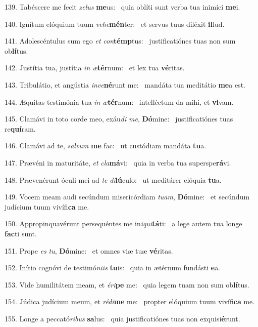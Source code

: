 139. Tabéscere me fecit \textit{ze}\textit{lus} \textbf{me}us: \ast\  quia oblíti sunt verba tua inimíci \textbf{me}i.\

140. Ignítum elóquium tuum \textit{ve}\textit{he}\textbf{mén}ter: \ast\  et servus tuus diléxit \textbf{il}lud.\

141. Adolescéntulus sum ego \textit{et} \textit{con}\textbf{témp}tus: \ast\  justificatiónes tuas non sum ob\textbf{lí}tus.\

142. Justítia tua, justítia \textit{in} \textit{æ}\textbf{tér}num: \ast\  et lex tua \textbf{vé}ritas.\

143. Tribulátio, et angústia \textit{in}\textit{ve}\textbf{né}runt me: \ast\  mandáta tua meditátio \textbf{me}a est.\

144. Æquitas testimónia tua \textit{in} \textit{æ}\textbf{tér}num: \ast\  intelléctum da mihi, et \textbf{vi}vam.\

145. Clamávi in toto corde meo, exáu\textit{di} \textit{me}, \textbf{Dó}mine: \ast\  justificatiónes tuas re\textbf{quí}ram.\

146. Clamávi ad te, \textit{sal}\textit{vum} \textbf{me} fac: \ast\  ut custódiam mandáta \textbf{tu}a.\

147. Prævéni in maturitáte, \textit{et} \textit{cla}\textbf{má}vi: \ast\  quia in verba tua superspe\textbf{rá}vi.\

148. Prævenérunt óculi mei ad \textit{te} \textit{di}\textbf{lú}culo: \ast\  ut meditárer elóquia \textbf{tu}a.\

149. Vocem meam audi secúndum misericórdiam \textit{tu}\textit{am}, \textbf{Dó}mine: \ast\  et secúndum judícium tuum vivífi\textbf{ca} me.\

150. Appropinquavérunt persequéntes me in\textit{i}\textit{qui}\textbf{tá}ti: \ast\  a lege autem tua longe \textbf{fac}ti sunt.\

151. Prope \textit{es} \textit{tu}, \textbf{Dó}mine: \ast\  et omnes viæ tuæ \textbf{vé}ritas.\

152. Inítio cognóvi de testimó\textit{ni}\textit{is} \textbf{tu}is: \ast\  quia in ætérnum fundásti \textbf{e}a.\

153. Vide humilitátem meam, et \textit{é}\textit{ri}\textbf{pe} me: \ast\  quia legem tuam non sum ob\textbf{lí}tus.\

154. Júdica judícium meum, et \textit{réd}\textit{i}\textbf{me} me: \ast\  propter elóquium tuum vivífi\textbf{ca} me.\

155. Longe a peccató\textit{ri}\textit{bus} \textbf{sa}lus: \ast\  quia justificatiónes tuas non exquisi\textbf{é}runt.\

